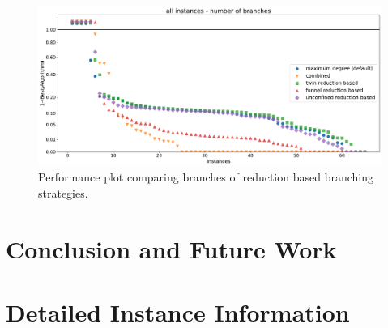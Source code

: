 \documentclass[a4paper,UKenglish,cleveref, autoref, thm-restate]{lipics-v2021}
\begin{document}
\begin{figure}[ht]
  \includegraphics[width=\textwidth]{plots/all_reduction_based_branch}
  \caption{Performance plot comparing branches of reduction based branching strategies.}
  \label{fig:all_reduction_branch}
\end{figure}

\section{Conclusion and Future Work}


\FloatBarrier


\newpage

\appendix

\section{Detailed Instance Information}
\label{app:instances}

\newpage
\end{document}
